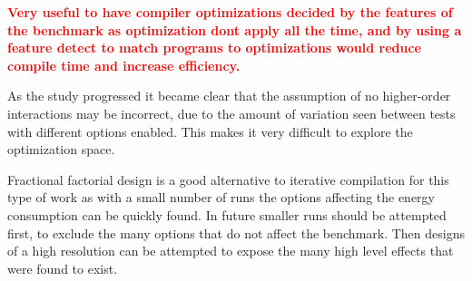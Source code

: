 \documentclass[twocolumn]{article}
\newcommand{\todo}[1]{\textbf{\textcolor{red}{#1}}}
\begin{document}

\todo{Very useful to have compiler optimizations decided by the features of the benchmark as optimization dont apply all the time, and by using a feature detect to match programs to optimizations would reduce compile time and increase efficiency.}

As the study progressed it became clear that the assumption of no higher-order interactions may be incorrect, due to the amount of variation seen between tests with different options enabled. This makes it very difficult to explore the optimization space.

Fractional factorial design is a good alternative to iterative compilation for this type of work as with a small number of runs the options affecting the energy consumption can be quickly found. In future smaller runs should be attempted first, to exclude the many options that do not affect the benchmark. Then designs of a high resolution can be attempted to expose the many high level effects that were found to exist.

\printbibliography
\end{document}
